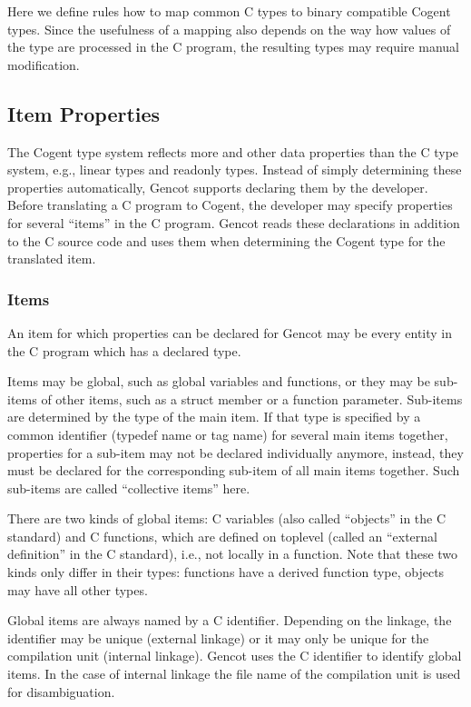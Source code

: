 
Here we define rules how to map common C types to binary compatible Cogent types. Since the usefulness of a mapping
also depends on the way how values of the type are processed in the C program, the resulting types may require manual 
modification.

\subsection{Item Properties}
\label{design-types-itemprops}

The Cogent type system reflects more and other data properties than the C type system, e.g., linear types
and readonly types. Instead of simply determining these properties automatically, Gencot supports declaring 
them by the developer. Before translating a C program to Cogent, the developer may specify properties
for several ``items'' in the C program. Gencot reads these declarations in addition to the C source code
and uses them when determining the Cogent type for the translated item.

\subsubsection{Items}

An item for which properties can be declared for Gencot may be every entity in the C program which has a declared type.

Items may be global, such as global variables and functions, or they may be sub-items of other items, such as a
struct member or a function parameter. Sub-items are determined by the type of the main item. If that type is
specified by a common identifier (typedef name or tag name) for several main items together, properties for
a sub-item may not be declared individually anymore, instead, they must be declared for the corresponding sub-item
of all main items together. Such sub-items are called ``collective items'' here.

There are two kinds of global items: C variables (also called ``objects'' in the C standard) and C functions, which
are defined on toplevel (called an ``external definition'' in the C standard), i.e., not locally in a function. Note that
these two kinds only differ in their types: functions have a derived function type, objects may have all other types.

Global items are always named by a C identifier. Depending on the linkage, the identifier may be unique (external linkage)
or it may only be unique for the compilation unit (internal linkage). Gencot uses the C identifier to identify global 
items. In the case of internal linkage the file name of the compilation unit is used for disambiguation.

